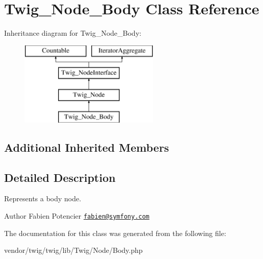 \hypertarget{classTwig__Node__Body}{}\section{Twig\+\_\+\+Node\+\_\+\+Body Class Reference}
\label{classTwig__Node__Body}
Inheritance diagram for Twig\+\_\+\+Node\+\_\+\+Body\+:\begin{figure}[H]
\begin{center}
\leavevmode
\includegraphics[height=4.000000cm]{classTwig__Node__Body}
\end{center}
\end{figure}
\subsection*{Additional Inherited Members}


\subsection{Detailed Description}
Represents a body node.

\begin{DoxyAuthor}{Author}
Fabien Potencier \href{mailto:fabien@symfony.com}{\tt fabien@symfony.\+com} 
\end{DoxyAuthor}


The documentation for this class was generated from the following file\+:\begin{DoxyCompactItemize}
\item 
vendor/twig/twig/lib/\+Twig/\+Node/Body.\+php\end{DoxyCompactItemize}
